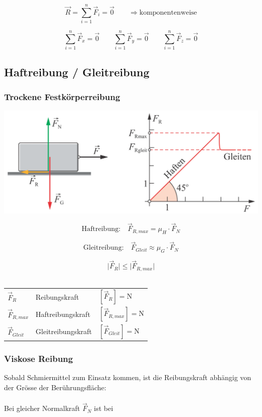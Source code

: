 		$$ \boxed{ \vec{R} = \sum \limits_{i = 1}^n \vec{F}_i = \vec{0} \qquad \Rightarrow \text{komponentenweise} }$$
		
		$$ \boxed{ \sum \limits_{i = 1}^n \vec{F}_x = \vec{0}  \qquad  \sum \limits_{i = 1}^n \vec{F}_y = \vec{0}  \qquad  \sum \limits_{i = 1}^n \vec{F}_z = \vec{0} } $$ 
			
	\subsection{Haftreibung / Gleitreibung}
	
		\subsubsection{Trockene Festkörperreibung}
	
			\includegraphics[width=0.7\linewidth]{Bilder/reibung} \\
		
			\begin{minipage}{0.65\linewidth}
				$$ \boxed{ \text{Haftreibung:} \quad \vec{F}_{R,max} = \mu_H \cdot \vec{F}_N } $$ 
				
				$$ \boxed{ \text{Gleitreibung:} \quad \vec{F}_{Gleit} \approx \mu_G \cdot \vec{F}_N } $$
			\end{minipage}
			\hfill
			\begin{minipage}{0.3\linewidth}
				$$ \boxed{ \vert \vec{F}_R \vert \leq \vert \vec{F}_{R,max} \vert } $$ \\
			\end{minipage}
		
			\begin{tabular}{lll}
				$\vec{F}_R$ & Reibungskraft & $[\vec{F}_R] = \mathrm{N}$ \\
				$\vec{F}_{R,max}$ & Haftreibungskraft & $[\vec{F}_{R,max}] = \mathrm{N}$ \\
				$\vec{F}_{Gleit}$ & Gleitreibungskraft & $[\vec{F}_{Gleit}] = \mathrm{N}$ \\
			\end{tabular}

		\subsubsection{Viskose Reibung}
			Sobald Schmiermittel zum Einsatz kommen, ist die Reibungskraft abhängig von der Grösse der Berührungsfläche: \\
			\\
			Bei gleicher Normalkraft $\vec{F}_N$ ist bei 
			
